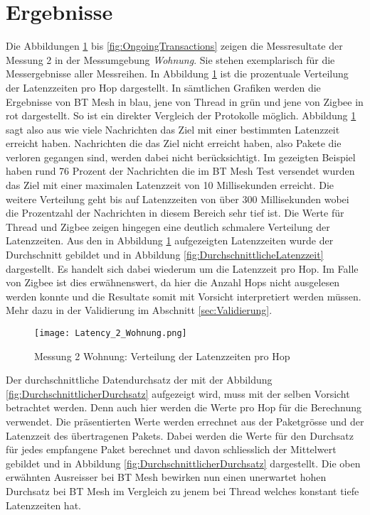 \clearpage
\section{Ergebnisse}\label{sec:Ergebnisse}
Die Abbildungen \ref{fig:VerteilungderLatenzzeiten} bis \ref{fig:OngoingTransactions} zeigen die Messresultate der Messung 2 in der Messumgebung \textit{Wohnung}. Sie stehen exemplarisch für die Messergebnisse aller Messreihen.
In Abbildung \ref{fig:VerteilungderLatenzzeiten} ist die prozentuale Verteilung der Latenzzeiten pro Hop dargestellt.
In sämtlichen Grafiken werden die Ergebnisse von BT Mesh in blau, jene von Thread in grün und jene von Zigbee in rot dargestellt.
So ist ein direkter Vergleich der Protokolle möglich.
Abbildung \ref{fig:VerteilungderLatenzzeiten} sagt also aus wie viele Nachrichten das Ziel mit einer bestimmten Latenzzeit erreicht haben.
Nachrichten die das Ziel nicht erreicht haben, also Pakete die verloren gegangen sind, werden dabei nicht berücksichtigt.
Im gezeigten Beispiel haben rund 76 Prozent der Nachrichten die im BT Mesh Test versendet wurden das Ziel mit einer maximalen Latenzzeit von 10 Millisekunden erreicht.
Die weitere Verteilung geht bis auf Latenzzeiten von über 300 Millisekunden wobei die Prozentzahl der Nachrichten in diesem Bereich sehr tief ist.
Die Werte für Thread und Zigbee zeigen hingegen eine deutlich schmalere Verteilung der Latenzzeiten.
Aus den in Abbildung \ref{fig:VerteilungderLatenzzeiten} aufgezeigten Latenzzeiten wurde der Durchschnitt gebildet und in Abbildung \ref{fig:DurchschnittlicheLatenzzeit} dargestellt.
Es handelt sich dabei wiederum um die Latenzzeit pro Hop. Im Falle von Zigbee ist dies erwähnenswert, da hier die Anzahl Hops nicht ausgelesen werden konnte und die Resultate somit mit Vorsicht interpretiert werden müssen. Mehr dazu in der Validierung im Abschnitt \ref{sec:Validierung}.

\begin{figure}[h]
	\centering
	\texttt{[image: Latency\_2\_Wohnung.png]}
	\caption{Messung 2 Wohnung: Verteilung der Latenzzeiten pro Hop}
	\label{fig:VerteilungderLatenzzeiten}
\end{figure}

\newpage
Der durchschnittliche Datendurchsatz der mit der Abbildung \ref{fig:DurchschnittlicherDurchsatz} aufgezeigt wird, muss mit der selben Vorsicht betrachtet werden. Denn auch hier werden die Werte pro Hop für die Berechnung verwendet.
Die präsentierten Werte werden errechnet aus der Paketgrösse und der Latenzzeit des übertragenen Pakets.
Dabei werden die Werte für den Durchsatz für jedes empfangene Paket berechnet und davon schliesslich der Mittelwert gebildet und in Abbildung \ref{fig:DurchschnittlicherDurchsatz} dargestellt.
Die oben erwähnten Ausreisser bei BT Mesh bewirken nun einen unerwartet hohen Durchsatz bei BT Mesh im Vergleich zu jenem bei Thread welches konstant tiefe Latenzzeiten hat.

